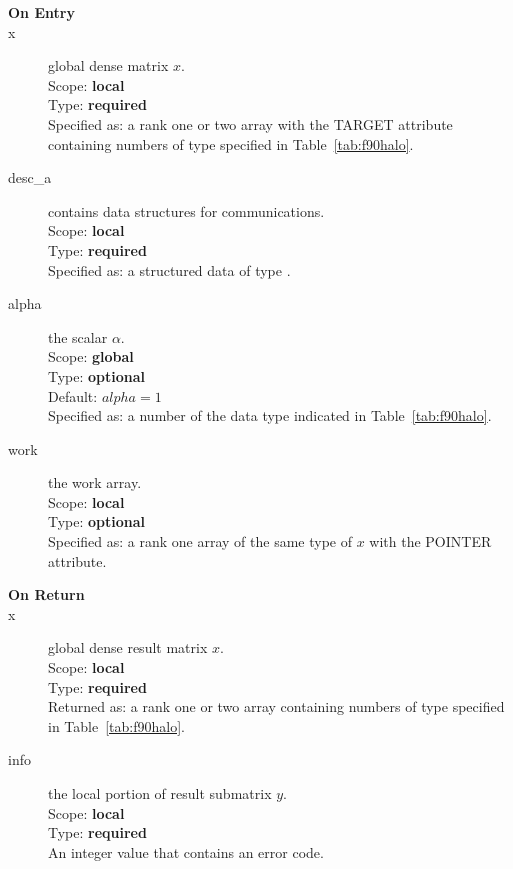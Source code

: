 \begin{description}
\item[\bf On Entry]
\item[x] global dense matrix $x$.\\
Scope: {\bf local} \\
Type: {\bf required} \\
Specified as:  a rank one or two array with the TARGET attribute
containing numbers of type specified in
Table~\ref{tab:f90halo}.
\item[desc\_a] contains data structures for communications.\\
Scope: {\bf local} \\
Type: {\bf required}\\
Specified as: a structured data of type \descdata.
\item[alpha] the scalar $\alpha$.\\
Scope: {\bf global} \\
Type: {\bf optional} \\
Default: $alpha = 1 $\\	
Specified as: a number of the data type indicated in Table~\ref{tab:f90halo}.
\item[work] the work array. \\
Scope: {\bf local} \\
Type: {\bf optional}\\
Specified as: a rank one array of the same type of $x$ with the
POINTER attribute.

\item[\bf On Return] 
\item[x] global dense result matrix $x$.\\
Scope: {\bf local} \\
Type: {\bf required} \\
Returned as:  a rank one or two array 
containing numbers of type specified in
Table~\ref{tab:f90halo}.
\item[info] the local portion of result submatrix $y$.\\
Scope: {\bf local} \\
Type: {\bf required} \\
An integer value that contains an error code. 
\end{description}
